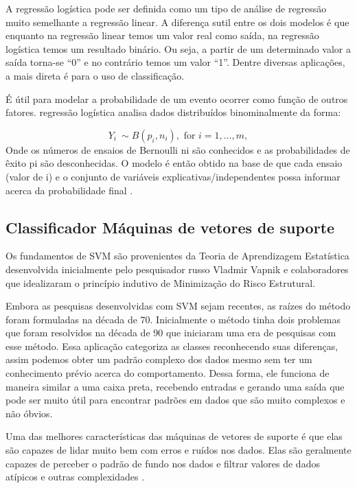 A regressão logística pode ser definida como um tipo de análise de regressão
muito semelhante a regressão linear. A diferença sutil entre os dois modelos é que
enquanto na regressão linear temos um valor real como saída, na regressão logística
temos um resultado binário. Ou seja, a partir de um determinado valor a saída torna-se “0” e no contrário temos um valor “1”. Dentre diversas aplicações, a mais direta é para o uso de classificação. 

É útil para modelar a probabilidade de um evento ocorrer como função de outros fatores.
 regressão logística analisa dados distribuídos binominalmente da forma:
 
\begin{equation}
     Y_{i}\ \sim B(p_{i},n_{i}),{\text{ for }}i=1,\dots ,m,
\end{equation}
Onde os números de ensaios de Bernoulli ni são conhecidos e as probabilidades de êxito pi são desconhecidas. O modelo é então obtido na base de que cada ensaio (valor de i) e o conjunto de variáveis explicativas/independentes possa informar acerca da probabilidade final \cite{logistica}.

\subsection{{Classificador Máquinas de vetores de suporte}}

Os fundamentos de SVM são provenientes da Teoria de Aprendizagem Estatística desenvolvida
inicialmente pelo pesquisador russo Vladmir Vapnik e colaboradores \cite{Vanpick} que idealizaram o princípio indutivo de Minimização do Risco Estrutural.

Embora as pesquisas desenvolvidas com SVM sejam recentes, as raízes do método foram
formuladas na década de 70. Inicialmente o método tinha dois problemas que foram resolvidos na década de 90 que iniciaram uma era de pesquisas com esse método.  
Essa aplicação categoriza as classes reconhecendo suas diferenças, assim podemos obter um padrão complexo dos dados mesmo sem ter um conhecimento prévio acerca do comportamento. Dessa forma, ele funciona de maneira similar a uma caixa preta, recebendo entradas e gerando uma saída que pode ser muito útil para encontrar padrões em dados que são muito complexos e não óbvios.

Uma das melhores características das máquinas de vetores de suporte é que elas são capazes de lidar muito bem com erros e ruídos nos dados. Elas são geralmente capazes de perceber o padrão de fundo nos dados e filtrar valores de dados atípicos e outras complexidades \cite{MetaQuotes}.







